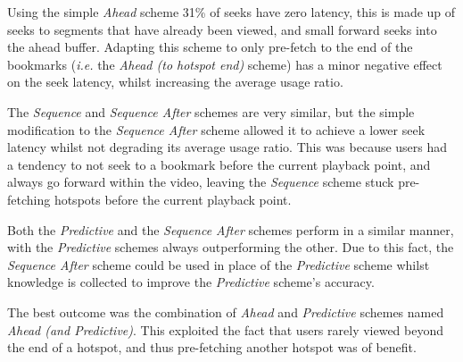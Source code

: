 Using the simple \emph{Ahead} scheme 31\% of seeks have zero latency, this is made up of seeks to segments that have already been viewed, and small forward seeks into the ahead buffer. Adapting this scheme to only pre-fetch to the end of the bookmarks (\emph{i.e.} the \emph{Ahead (to hotspot end)} scheme) has a minor negative effect on the seek latency, whilst increasing the average usage ratio.

The \emph{Sequence} and \emph{Sequence After} schemes are very similar, but the simple modification to the \emph{Sequence After} scheme allowed it to achieve a lower seek latency whilst not degrading its average usage ratio. This was because users had a tendency to not seek to a bookmark before the current playback point, and always go forward within the video, leaving the \emph{Sequence} scheme stuck pre-fetching hotspots before the current playback point.

Both the \emph{Predictive} and the \emph{Sequence After} schemes perform in a similar manner, with the \emph{Predictive} schemes always outperforming the other. Due to this fact, the \emph{Sequence After} scheme could be used in place of the \emph{Predictive} scheme whilst knowledge is collected to improve the \emph{Predictive} scheme's accuracy.

The best outcome was the combination of \emph{Ahead} and \emph{Predictive} schemes named \emph{Ahead (and Predictive)}. This exploited the fact that users rarely viewed beyond the end of a hotspot, and thus pre-fetching another hotspot was of benefit.





